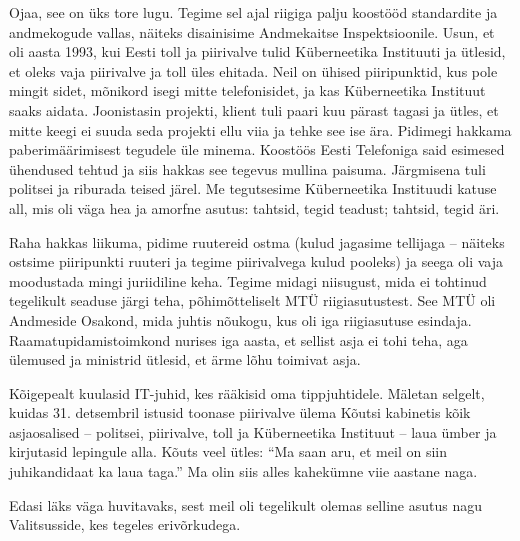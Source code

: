 Ojaa, see on üks tore lugu. Tegime sel ajal
riigiga palju koostööd standardite ja andmekogude 
vallas, näiteks disainisime Andmekaitse Inspektsioonile. 
Usun, et oli aasta 1993, kui Eesti toll ja piirivalve tulid Küberneetika Instituuti ja ütlesid, et 
oleks vaja piirivalve ja toll üles ehitada. Neil on 
ühised piiripunktid, kus pole mingit sidet, mõnikord isegi mitte 
telefonisidet, ja kas Küberneetika Instituut saaks aidata. 
Joonistasin projekti, klient tuli paari kuu pärast tagasi ja ütles, et mitte keegi ei 
suuda seda projekti ellu viia ja tehke see ise ära. 
Pidimegi hakkama paberimäärimisest tegudele üle minema. 
Koostöös Eesti Telefoniga 
said esimesed ühendused tehtud ja siis hakkas see tegevus mullina 
paisuma. Järgmisena tuli politsei ja riburada teised järel. Me 
tegutsesime Küberneetika Instituudi katuse all, mis oli väga hea ja
amorfne asutus: tahtsid, tegid teadust; tahtsid, tegid äri.

Raha hakkas liikuma, pidime ruutereid 
ostma (kulud jagasime tellijaga – näiteks ostsime piiripunkti ruuteri ja tegime piirivalvega kulud pooleks) ja seega oli vaja moodustada mingi juriidiline keha. Tegime midagi niisugust, mida 
ei tohtinud tegelikult seaduse järgi teha, põhimõtteliselt MTÜ riigiasutustest. 
See MTÜ oli Andmeside Osakond, mida juhtis nõukogu, kus oli iga riigiasutuse esindaja.
Raamatupidamistoimkond nurises iga aasta, et sellist asja ei tohi teha, aga 
ülemused ja ministrid ütlesid, et ärme lõhu 
toimivat asja.


Kõigepealt kuulasid IT-juhid, kes rääkisid oma tippjuhtidele. 
Mäletan selgelt, kuidas 31. detsembril istusid toonase 
piirivalve ülema Kõutsi 
kabinetis kõik asjaosalised – politsei, piirivalve, toll ja Küberneetika 
Instituut – laua ümber ja kirjutasid lepingule alla. Kõuts veel ütles: \enquote{Ma saan aru, et meil on siin juhikandidaat ka laua taga.} Ma olin siis alles kahekümne viie aastane naga. 

Edasi läks väga huvitavaks, sest meil oli tegelikult olemas selline asutus nagu 
Valitsusside, kes tegeles erivõrkudega.


